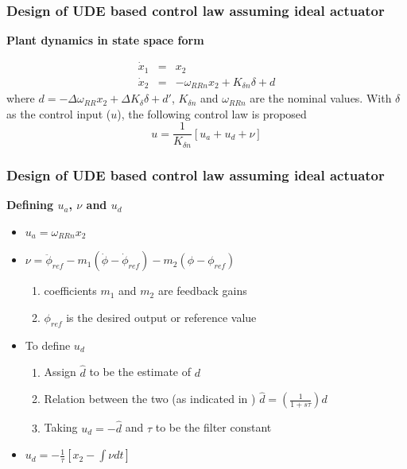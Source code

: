 \documentclass[table,10pt,red]{beamer}	%
\begin{document}
\begin{frame}
	\frametitle{Design of UDE based control law assuming ideal actuator}
	\textbf{Plant dynamics in state space form} 	

\begin{eqnarray*}
\dot{x}_1 &=& x_2 \nonumber \\
\dot{x}_2 &=& - \omega_{RRn}x_2 + K_{\delta n}\delta + d
\label{eq4}
\end{eqnarray*}
%
where $d = -\Delta\omega_{RR}x_2 + \Delta K_{\delta} \delta + d'$, $K_{\delta n}$ and $\omega_{RRn}$ are the nominal values.
With $\delta$ as the control input ($u$), the following control law is proposed 
%
\begin{equation*}
u = \frac{1}{K_{\delta n}}\left[u_a + u_d + \nu \right]
\label{eq5}
\end{equation*}
%
\end{frame}
\begin{frame}
\frametitle{Design of UDE based control law assuming ideal actuator}
\textbf{Defining $u_a$, $\nu$ and $u_d$}
\begin{itemize}  %
		\item $u_a= \omega_{RRn}x_2$
		\item $\nu =\ddot{\phi}_{ref} - m_1(\dot{\phi} - \dot{\phi}_{ref}) - m_2(\phi - \phi_{ref})$
				\begin{enumerate}
					\item coefficients $m_1$ and $m_2$ are feedback gains
					\item $\phi_{ref}$ is the desired output or reference value
				\end{enumerate}
		\item To define $u_d$
				\begin{enumerate}
					\item Assign $\hat d$ to be the estimate of $d$ 
					\item Relation between the two (as indicated in \cite{zhong2004}) $\hat d = \left( \frac{1}{1 + s\tau}\right)d$
					\item Taking $u_d= - \hat {d}$ and $\tau$ to be the filter constant 
				\end{enumerate}
		\item <+-|alert@+>	$u_d= - \frac{1}{\tau}\left[x_2 - \int \nu dt\right]$
\end{itemize}
\end{frame}
\end{document}
